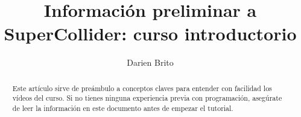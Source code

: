 \documentclass[12pt, letterpaper]{report}
\title{Información preliminar a \\ SuperCollider: curso introductorio}
\author{Darien Brito}
\begin{document}
\begin{titlepage}
\maketitle
\end{titlepage}

\begin{abstract}
Este artículo sirve de preámbulo a conceptos claves para entender con facilidad los vídeos del curso. Si no tienes ninguna experiencia previa con programación, asegúrate de leer la información en este documento antes de empezar el tutorial.
\end{abstract}

\tableofcontents{}
\listoffigures
\pagestyle{plain}




\end{document}
